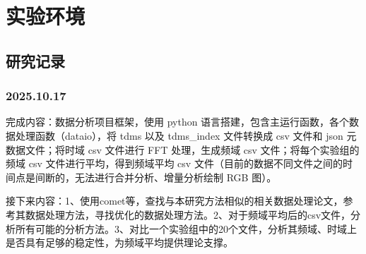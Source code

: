 \appendix
\chapter{实验环境}

\section{研究记录}
\subsection{2025.10.17}
完成内容：数据分析项目框架，使用 python 语言搭建，包含主运行函数，各个数据处理函数（dataio），将 tdms 以及 tdms\_index 文件转换成 csv 文件和 json 元数据文件；将时域 csv 文件进行 FFT 处理，生成频域 csv 文件；将每个实验组的频域 csv 文件进行平均，得到频域平均 csv 文件（目前的数据不同文件之间的时间点是间断的，无法进行合并分析、增量分析绘制 RGB 图）。

接下来内容：1、使用comet等，查找与本研究方法相似的相关数据处理论文，参考其数据处理方法，寻找优化的数据处理方法。2、对于频域平均后的csv文件，分析所有可能的分析方法。3、对比一个实验组中的20个文件，分析其频域、时域上是否具有足够的稳定性，为频域平均提供理论支撑。
